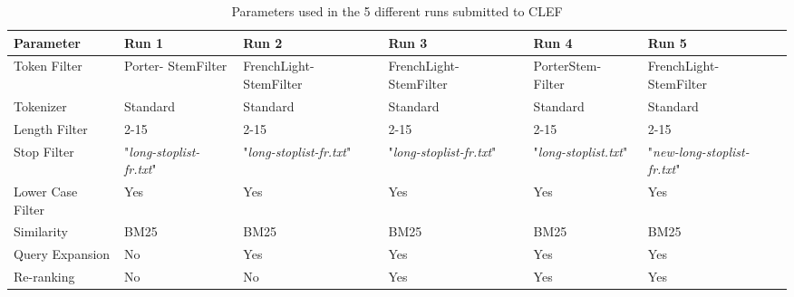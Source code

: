 \begin{table}
    \hspace*{-2.4cm}
    \begin{tabularx}{1.33\textwidth}{|l|X|X|X|X|X|} 
    \hline
    \textbf{Parameter} & \textbf{Run 1} & \textbf{Run 2} & \textbf{Run 3} & \textbf{Run 4} & \textbf{Run 5} \\
    \hline
    Token Filter & Porter- \newline StemFilter & FrenchLight- \newline StemFilter & FrenchLight- \newline StemFilter & PorterStem- \newline Filter & FrenchLight- \newline StemFilter \\
    \hline
    Tokenizer & Standard & Standard & Standard & Standard & Standard \\
    \hline
    Length Filter & 2-15 & 2-15 & 2-15 & 2-15 & 2-15 \\
    \hline
    Stop Filter & "\textit{long-stoplist-fr.txt}" & "\textit{long-stoplist-fr.txt}" & "\textit{long-stoplist-fr.txt}" & "\textit{long-stoplist.txt}" & "\textit{new-long-stoplist-fr.txt}" \\
    \hline
    Lower Case Filter & Yes & Yes & Yes & Yes & Yes \\
    \hline
    Similarity & BM25 & BM25 & BM25 & BM25 & BM25 \\
    \hline
    Query Expansion & No & Yes & Yes & Yes & Yes \\
    \hline
    Re-ranking & No & No & Yes & Yes & Yes \\
    \hline
    \end{tabularx}
    \caption{Parameters used in the 5 different runs submitted to \ac{CLEF}}
    \label{tab:run_parameters}
\end{table}        

